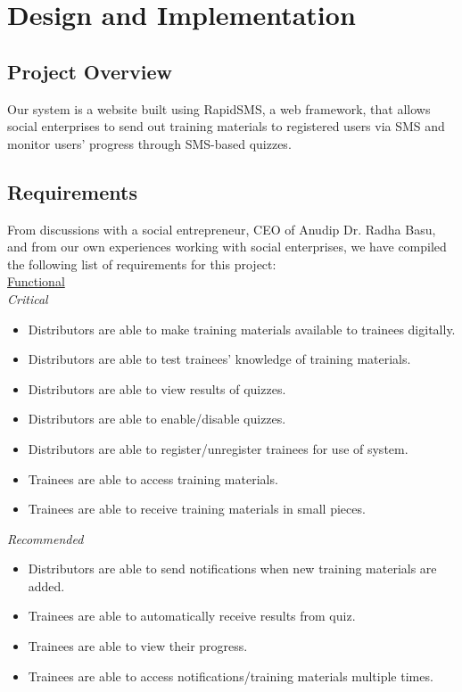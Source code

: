\chapter{Design and Implementation}

\section{Project Overview}
Our system is a website built using RapidSMS, a web framework, that allows social enterprises to send out training materials to registered users via SMS and monitor users’ progress through SMS-based quizzes.

\section{Requirements}
From discussions with a social entrepreneur, CEO of Anudip Dr. Radha Basu, and from our own experiences working with social enterprises, we have compiled the following list of requirements for this project: \\[-0.7\baselineskip]

\underline{Functional}\\
\textit{Critical}
\begin{itemize}
\item Distributors are able to make training materials available to trainees digitally.
\item Distributors are able to test trainees’ knowledge of training materials.
\item Distributors are able to view results of quizzes.
\item Distributors are able to enable/disable quizzes.
\item Distributors are able to register/unregister trainees for use of system.
\item Trainees are able to access training materials.
\item Trainees are able to receive training materials in small pieces.
\end{itemize}

\textit{Recommended}
\begin{itemize}
\item Distributors are able to send notifications when new training materials are added.
\item Trainees are able to automatically receive results from quiz.
\item Trainees are able to view their progress.
\item Trainees are able to access notifications/training materials multiple times.
\end{itemize}

